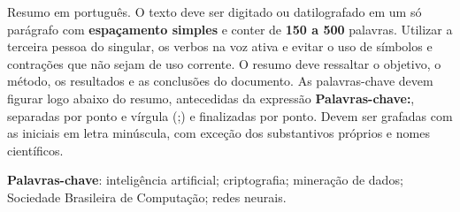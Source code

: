 \begin{resumo}
\begin{SingleSpace}
Resumo em português. O texto deve ser digitado ou datilografado em um só parágrafo com \textbf{espaçamento simples} e conter de \textbf{150 a 500} palavras. Utilizar a terceira pessoa do singular, os verbos na voz ativa e evitar o uso de símbolos e contrações que não sejam de uso corrente. O resumo deve ressaltar o  objetivo, o método, os resultados e as conclusões do documento. As palavras-chave devem figurar logo abaixo do resumo, antecedidas da expressão \textbf{Palavras-chave:}, separadas por ponto e vírgula (;) e finalizadas por ponto. Devem ser grafadas com as iniciais em letra minúscula, com exceção dos substantivos próprios e nomes científicos.
\end{SingleSpace}
\vspace{\onelineskip}
\textbf{Palavras-chave}: inteligência artificial; criptografia; mineração de dados; Sociedade Brasileira de Computação; redes neurais.

\end{resumo}



